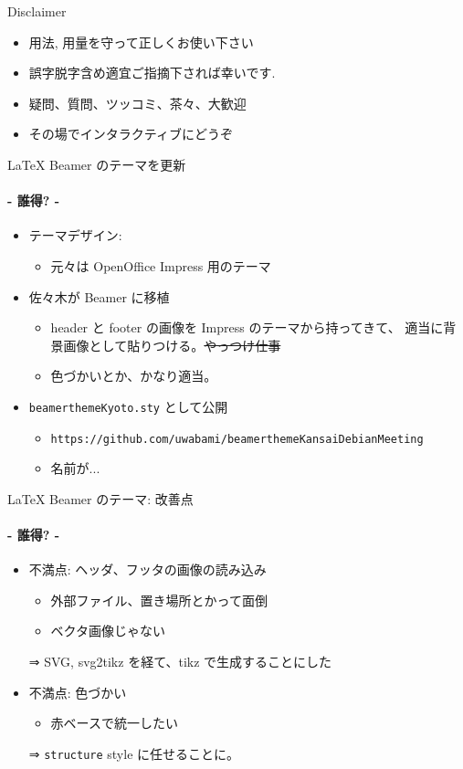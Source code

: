 \documentclass[cjk,dvipdfmx,14pt,compress,fragile]{beamer}
\newcommand{\textfootnotesize}[1]{{\footnotesize{#1}}}
\begin{document}
\begin{frame}{Disclaimer}
  \begin{itemize}
  \item 用法, 用量を守って正しくお使い下さい
  \item 誤字脱字含め適宜ご指摘下されば幸いです.
  \item 疑問、質問、ツッコミ、茶々、\alert{大歓迎}

  \item その場でインタラクティブにどうぞ
\end{itemize}
\end{frame}

\begin{frame}{LaTeX Beamer のテーマを更新}
  \framesubtitle{- 誰得? -}
  \begin{itemize}
  \item テーマデザイン: \href{http://twitter.com/nogajun/}{\color{blue}{@nogajun}}
    \begin{itemize}
    \item 元々は OpenOffice Impress 用のテーマ
    \end{itemize}
  \item 佐々木が Beamer に移植
    \begin{itemize}
    \item header と footer の画像を Impress のテーマから持ってきて、
      適当に背景画像として貼りつける。\sout{やっつけ仕事}
    \item 色づかいとか、かなり適当。
    \end{itemize}
  \item \texttt{beamerthemeKyoto.sty} として公開
    \begin{itemize}
    \item \textfootnotesize{\texttt{https://github.com/uwabami/beamerthemeKansaiDebianMeeting}}
    \item 名前が...
    \end{itemize}
  \end{itemize}
\end{frame}

\begin{frame}{LaTeX Beamer のテーマ: 改善点}
  \framesubtitle{- 誰得? -}
  \begin{itemize}[<+->]
  \item 不満点: ヘッダ、フッタの画像の読み込み
    \begin{itemize}
    \item 外部ファイル、置き場所とかって面倒
    \item ベクタ画像じゃない
    \end{itemize}
  \item[⇒] SVG, svg2tikz を経て、tikz で生成することにした
  \item 不満点: 色づかい
    \begin{itemize}
    \item 赤ベースで統一したい
    \end{itemize}
  \item[⇒] \texttt{structure} style に任せることに。
  \end{itemize}
\end{frame}
\end{document}

